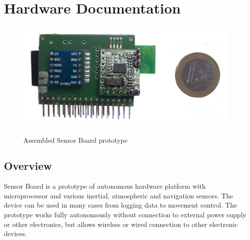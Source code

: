 \chapter{Hardware Documentation}

\begin{figure}[H]
	\centering
	\includegraphics[width=16cm]{img/HWassembled.jpg}
	\label{HWassembled}
	\caption{Assembled Sensor Board prototype}
\end{figure}

\section{Overview}
Sensor Board is a prototype of autonomous hardware platform with microprocessor and various inertial, atmospheric and navigation sensors. The device can be used in many cases from logging data to movement control. The prototype works fully autonomously without connection to external power supply or other electronics, but allows wireless or wired connection to other electronic devices.

